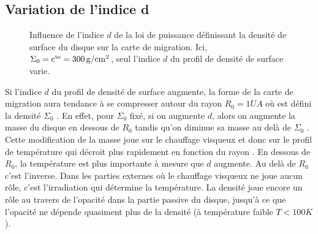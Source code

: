 \subsection{Variation de l'indice d}
\begin{figure}[htbp]
\centering
{}\hfill
{}

\hfill
{}

\caption{Influence de l'indice $d$ de la loi de puissance définissant la densité de surface du disque sur la carte de migration.
Ici, $\Sigma_0=\mathrm{c^{te}}=300\mathrm{\thinspace g/cm^2}$, seul l'indice $d$ du profil de densité de surface varie. }\label{fig:map_index}
\end{figure}

Si l'indice $d$ du profil de densité de surface augmente, la forme de la carte de migration aura tendance à se compresser autour
du rayon $R_0=1\unit{UA}$ où est défini la densité $\Sigma_0$ . En effet, pour $\Sigma_0$ fixé, si on
augmente $d$, alors on augmente la masse du disque en dessous de $R_0$ tandis qu'on diminue sa masse au delà de $\Sigma_0$
. Cette modification de la masse joue sur le chauffage visqueux et donc sur le profil de température
qui décroit plus rapidement en fonction du rayon . En dessous de $R_0$, la température est plus
importante à mesure que $d$ augmente. Au delà de $R_0$ c'est l'inverse. Dans les parties externes où le chauffage visqueux ne
joue aucun rôle, c'est l'irradiation qui détermine la température. La densité joue encore un rôle au travers de l'opacité dans
la partie passive du disque, jusqu'à ce que l'opacité ne dépende quasiment plus de la densité (à température faible
$T<100\unit{K}$).

